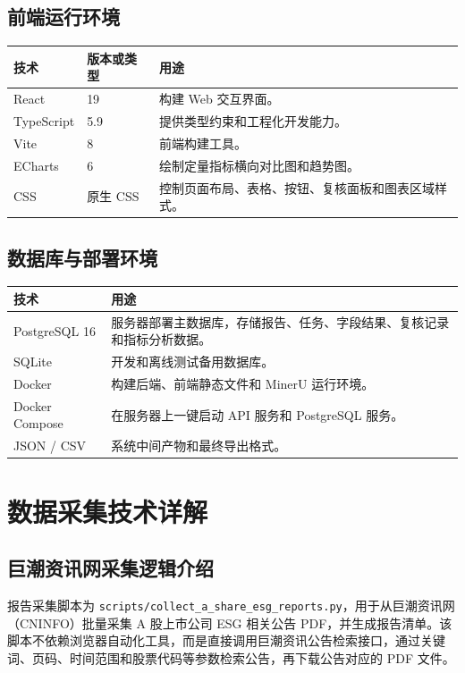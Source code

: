 \documentclass[UTF8,a4paper,12pt]{ctexart}
\newenvironment{manualtable}[1]{%
  \small
  \begin{longtable}{#1}
}{%
  \end{longtable}
  \normalsize
}
\begin{document}
\subsection{前端运行环境}

\begin{manualtable}{p{3.5cm}p{3cm}p{8cm}}
\toprule
\textbf{技术} & \textbf{版本或类型} & \textbf{用途} \\
\midrule
\endhead
React & 19 & 构建 Web 交互界面。 \\
TypeScript & 5.9 & 提供类型约束和工程化开发能力。 \\
Vite & 8 & 前端构建工具。 \\
ECharts & 6 & 绘制定量指标横向对比图和趋势图。 \\
CSS & 原生 CSS & 控制页面布局、表格、按钮、复核面板和图表区域样式。 \\
\bottomrule
\end{manualtable}

\subsection{数据库与部署环境}

\begin{manualtable}{p{4cm}p{10cm}}
\toprule
\textbf{技术} & \textbf{用途} \\
\midrule
\endhead
PostgreSQL 16 & 服务器部署主数据库，存储报告、任务、字段结果、复核记录和指标分析数据。 \\
SQLite & 开发和离线测试备用数据库。 \\
Docker & 构建后端、前端静态文件和 MinerU 运行环境。 \\
Docker Compose & 在服务器上一键启动 API 服务和 PostgreSQL 服务。 \\
JSON / CSV & 系统中间产物和最终导出格式。 \\
\bottomrule
\end{manualtable}

\section{数据采集技术详解}

\subsection{巨潮资讯网采集逻辑介绍}

报告采集脚本为 \texttt{scripts/collect\_a\_share\_esg\_reports.py}，用于从巨潮资讯网（CNINFO）批量采集 A 股上市公司 ESG 相关公告 PDF，并生成报告清单。该脚本不依赖浏览器自动化工具，而是直接调用巨潮资讯公告检索接口，通过关键词、页码、时间范围和股票代码等参数检索公告，再下载公告对应的 PDF 文件。
\end{document}
